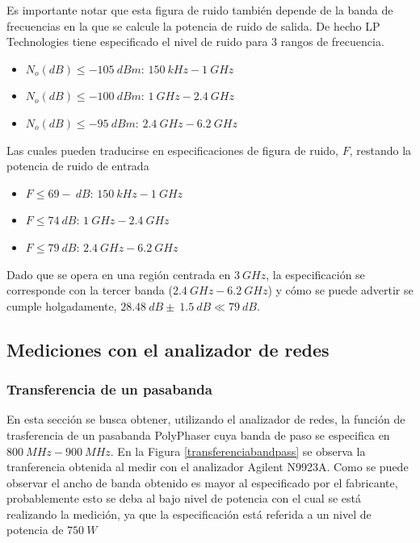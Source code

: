 \documentclass[a4paper,10pt]{article}
\begin{document}
		\indent Es importante notar que esta figura de ruido tambi\'en depende 
		de la banda de frecuencias en la que se calcule la potencia de ruido de 
		salida. De hecho LP Technologies tiene especificado el nivel de ruido 
		para 3 rangos de frecuencia.
		
		\begin{itemize}
			\item $N_o(dB)\leq-105~dBm$: 	$150~kHz-1~GHz$
			\item $N_o(dB)\leq-100~dBm$:	 $1~GHz-2.4~GHz$
			\item $N_o(dB)\leq-95~dBm$:	 $2.4~GHz-6.2~GHz$
		\end{itemize}
		
		\indent Las cuales pueden traducirse en especificaciones de figura de 
		ruido, $F$, restando la potencia de ruido de entrada
		
		\begin{itemize}
			\item $F\leq69-~dB$: 	$150~kHz-1~GHz$
			\item $F\leq74~dB$:	 $1~GHz-2.4~GHz$
			\item $F\leq79~dB$:	 $2.4~GHz-6.2~GHz$
		\end{itemize}
		
		\indent Dado que se opera en una regi\'on centrada en $3~GHz$, la 
		especificaci\'on se corresponde con la tercer banda ($2.4~GHz-6.2~GHz$) 
		y c\'omo se puede advertir se cumple holgadamente, 
		$28.48~dB\pm~1.5~dB\ll79~dB$.
		
	\subsection{Mediciones con el analizador de redes}
		\subsubsection{Transferencia de un pasabanda}
		\indent En esta secci\'on se busca obtener, utilizando el analizador de 
		redes, la funci\'on de trasferencia de un pasabanda PolyPhaser cuya 
		banda de paso se especifica en  $800~MHz-900~MHz$. En la Figura 
		\ref{transferenciabandpass} se observa la tranferencia obtenida al 
		medir con el analizador Agilent N9923A. Como se puede observar el ancho 
		de banda obtenido es mayor al especificado por el fabricante, 
		probablemente esto se deba al bajo nivel de potencia con el cual se 
		est\'a realizando la medici\'on, ya que la especificaci\'on est\'a 
		referida a un nivel de potencia de $750~W$
		
\end{document}
